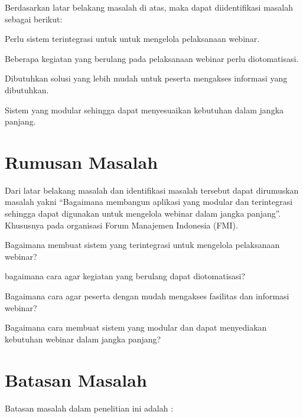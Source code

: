 Berdasarkan latar belakang masalah di atas, maka dapat diidentifikasi masalah
sebagai berikut:

\begin{ol}
  \item Perlu sistem terintegrasi untuk untuk mengelola pelaksanaan webinar.
  \item Beberapa kegiatan yang berulang pada pelaksanaan webinar perlu diotomatisasi.
  \item Dibutuhkan solusi yang lebih mudah untuk peserta mengakses informasi yang dibutuhkan.
  \item Sistem yang modular sehingga dapat menyesuaikan kebutuhan dalam jangka panjang.
\end{ol}


\section{Rumusan Masalah}

Dari latar belakang masalah dan identifikasi masalah tersebut dapat dirumuskan
masalah yakni “Bagaimana membangun aplikasi yang modular dan terintegrasi
sehingga dapat digunakan untuk mengelola webinar dalam jangka panjang”.
Khususnya pada organisasi Forum Manajemen Indonesia (FMI).

\begin{ol}
\item Bagaimana membuat sistem yang terintegrasi untuk mengelola pelaksanaan webinar?
\item bagaimana cara agar kegiatan yang berulang dapat diotomatisasi?
\item Bagaimana cara agar peserta dengan mudah mengakses fasilitas dan informasi webinar?
\item Bagaimana cara membuat sistem yang modular dan dapat menyediakan kebutuhan webinar dalam jangka panjang?
\end{ol}

\section{Batasan Masalah}

Batasan masalah dalam penelitian ini adalah :

